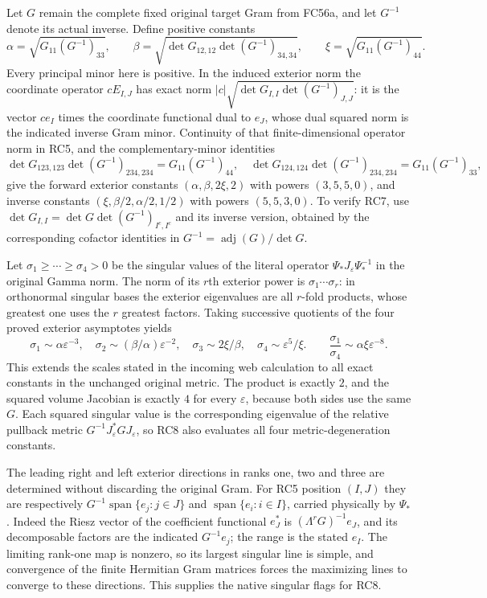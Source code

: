 \documentclass[11pt]{article}
\begin{document}
Let $G$ remain the complete fixed original target Gram from FC56a,
and let $G^{-1}$ denote its actual inverse. Define positive constants
\[
 \alpha=\sqrt{G_{11}(G^{-1})_{33}},\qquad
 \beta=\sqrt{\det G_{12,12}\det(G^{-1})_{34,34}},\qquad
 \xi=\sqrt{G_{11}(G^{-1})_{44}}. \tag{RC6}
\]
Every principal minor here is positive. In the induced exterior
norm the coordinate operator $cE_{I,J}$ has exact norm
$|c|\sqrt{\det G_{I,I}\det(G^{-1})_{J,J}}$: it is the vector
$ce_I$ times the coordinate functional dual to $e_J$, whose
dual squared norm is the indicated inverse Gram minor.
Continuity of that finite-dimensional operator norm in RC5, and
the complementary-minor identities
\[
 \det G_{123,123}\det(G^{-1})_{234,234}
       =G_{11}(G^{-1})_{44},\quad
 \det G_{124,124}\det(G^{-1})_{234,234}
       =G_{11}(G^{-1})_{33}, \tag{RC7}
\]
give the forward exterior constants $(\alpha,\beta,2\xi,2)$
with powers $(3,5,5,0)$, and inverse constants
$(\xi,\beta/2,\alpha/2,1/2)$ with powers $(5,5,3,0)$.
To verify RC7, use
$\det G_{I,I}=\det G\det(G^{-1})_{I^c,I^c}$ and its inverse
version, obtained by the corresponding cofactor identities in
$G^{-1}=\operatorname{adj}(G)/\det G$.

Let $\sigma_1\ge\cdots\ge\sigma_4>0$ be the singular values of
the literal operator $\Psi_*J_\varepsilon\Psi_*^{-1}$ in the
original Gamma norm. The norm of its $r$th exterior power is
$\sigma_1\cdots\sigma_r$: in orthonormal singular bases the
exterior eigenvalues are all $r$-fold products, whose greatest
one uses the $r$ greatest factors. Taking successive quotients
of the four proved exterior asymptotes yields
\[
 \boxed{
 \sigma_1\sim\alpha\varepsilon^{-3},\quad
 \sigma_2\sim(\beta/\alpha)\varepsilon^{-2},\quad
 \sigma_3\sim2\xi/\beta,\quad
 \sigma_4\sim\varepsilon^5/\xi.}
 \qquad
 \frac{\sigma_1}{\sigma_4}\sim\alpha\xi\varepsilon^{-8}.
 \tag{RC8}
\]
This extends the scales stated in the incoming web calculation to
all exact constants in the unchanged original metric. The product
is exactly $2$, and the squared volume Jacobian is exactly $4$
for every $\varepsilon$, because both sides use the same $G$.
Each squared singular value is the corresponding eigenvalue of
the relative pullback metric $G^{-1}J_\varepsilon^*GJ_\varepsilon$,
so RC8 also evaluates all four metric-degeneration constants.

The leading right and left exterior directions in ranks one,
two and three are determined without discarding the original
Gram. For RC5 position $(I,J)$ they are respectively
$G^{-1}\operatorname{span}\{e_j:j\in J\}$ and
$\operatorname{span}\{e_i:i\in I\}$, carried physically by
$\Psi_*$. Indeed the Riesz vector of the coefficient functional
$e_J^*$ is $(\Lambda^rG)^{-1}e_J$, and its decomposable factors
are the indicated $G^{-1}e_j$; the range is the stated $e_I$.
The limiting rank-one map is nonzero, so its largest singular
line is simple, and convergence of the finite Hermitian Gram
matrices forces the maximizing lines to converge to these
directions. This supplies the native singular flags for RC8.
\end{document}
